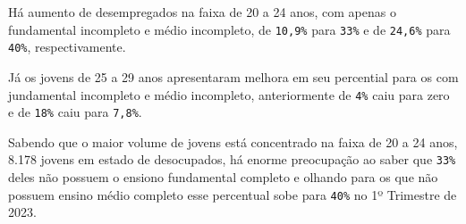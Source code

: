 \documentclass[
  12pt,
  a4paper,
]{article}
\begin{document}
\endgroup{}

Há aumento de desempregados na faixa de 20 a 24 anos, com apenas o
fundamental incompleto e médio incompleto, de \texttt{10,9\%} para
\texttt{33\%} e de \texttt{24,6\%} para \texttt{40\%}, respectivamente.

Já os jovens de 25 a 29 anos apresentaram melhora em seu percential para
os com jundamental incompleto e médio incompleto, anteriormente de
\texttt{4\%} caiu para zero e de \texttt{18\%} caiu para \texttt{7,8\%}.

\FloatBarrier

\FloatBarrier

Sabendo que o maior volume de jovens está concentrado na faixa de 20 a
24 anos, 8.178 jovens em estado de desocupados, há enorme preocupação ao
saber que \texttt{33\%} deles não possuem o ensiono fundamental completo
e olhando para os que não possuem ensino médio completo esse percentual
sobe para \texttt{40\%} no 1º Trimestre de 2023.

\begingroup\fontsize{9}{11}\selectfont
\end{document}
